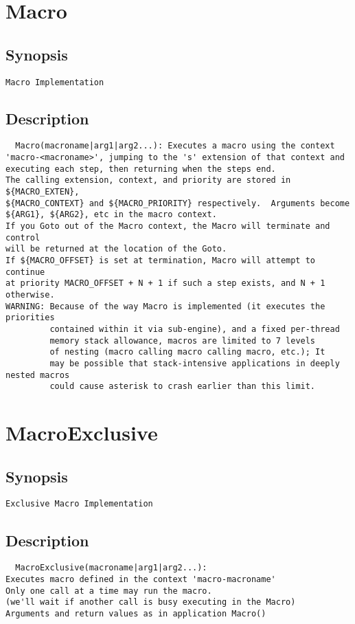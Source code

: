 \section{Macro}
\subsection{Synopsis}
\begin{verbatim}
Macro Implementation
\end{verbatim}
\subsection{Description}
\begin{verbatim}
  Macro(macroname|arg1|arg2...): Executes a macro using the context
'macro-<macroname>', jumping to the 's' extension of that context and
executing each step, then returning when the steps end. 
The calling extension, context, and priority are stored in ${MACRO_EXTEN}, 
${MACRO_CONTEXT} and ${MACRO_PRIORITY} respectively.  Arguments become
${ARG1}, ${ARG2}, etc in the macro context.
If you Goto out of the Macro context, the Macro will terminate and control
will be returned at the location of the Goto.
If ${MACRO_OFFSET} is set at termination, Macro will attempt to continue
at priority MACRO_OFFSET + N + 1 if such a step exists, and N + 1 otherwise.
WARNING: Because of the way Macro is implemented (it executes the priorities
         contained within it via sub-engine), and a fixed per-thread
         memory stack allowance, macros are limited to 7 levels
         of nesting (macro calling macro calling macro, etc.); It
         may be possible that stack-intensive applications in deeply nested macros
         could cause asterisk to crash earlier than this limit.

\end{verbatim}


\section{MacroExclusive}
\subsection{Synopsis}
\begin{verbatim}
Exclusive Macro Implementation
\end{verbatim}
\subsection{Description}
\begin{verbatim}
  MacroExclusive(macroname|arg1|arg2...):
Executes macro defined in the context 'macro-macroname'
Only one call at a time may run the macro.
(we'll wait if another call is busy executing in the Macro)
Arguments and return values as in application Macro()

\end{verbatim}


